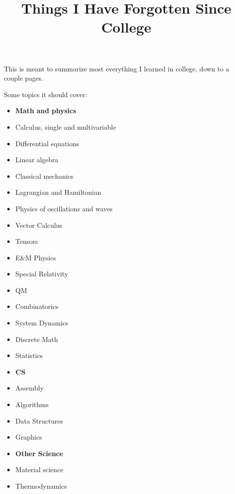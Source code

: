 \documentclass[10pt]{article}
\title{\bf Things I Have Forgotten Since College}
\author{}
\date{}
\begin{document}
\maketitle

This is meant to summarize most everything I learned in college, down
to a couple pages.

Some topics it should cover:
\begin{itemize}
\item \textbf{Math and physics}
\item Calculus, single and multivariable
\item Differential equations
\item Linear algebra
\item Classical mechanics
\item Lagrangian and Hamiltonian
\item Physics of oscillations and waves
\item Vector Calculus
\item Tensors
\item E\&M Physics
\item Special Relativity
\item QM
\item Combinatorics
\item System Dynamics
\item Discrete Math
\item Statistics
\item \textbf{CS}
\item Assembly
\item Algorithms
\item Data Structures
\item Graphics
\item \textbf{Other Science}
\item Material science
\item Thermodynamics
  
\end{itemize}

\newpage


\newpage


\newpage

\end{document}
